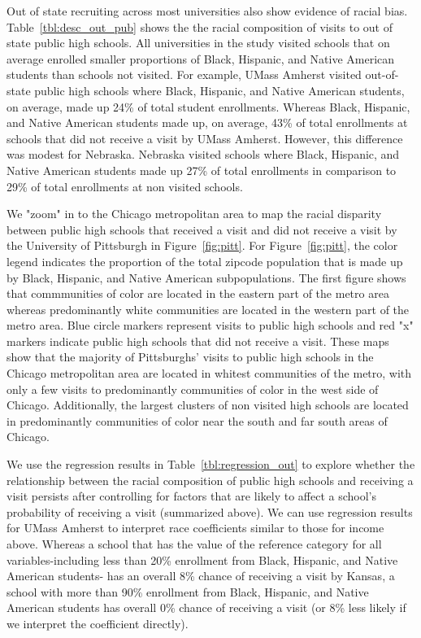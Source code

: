 \documentclass[twoside]{article}
\begin{document}
Out of state recruiting across most universities also show evidence of racial bias. Table~\ref{tbl:desc_out_pub} shows the the racial composition of visits to out of state public high schools. All universities in the study visited schools that on average enrolled smaller proportions of Black, Hispanic, and Native American students than schools not visited. For example, UMass Amherst visited out-of-state public high schools where Black, Hispanic, and Native American students, on average, made up 24\% of total student enrollments. Whereas Black, Hispanic, and Native American students made up, on average, 43\% of total enrollments at schools that did not receive a visit by UMass Amherst. However, this difference was modest for Nebraska. Nebraska visited schools where Black, Hispanic, and Native American students made up 27\% of total enrollments in comparison to 29\% of total enrollments at non visited schools.

We "zoom" in to the Chicago metropolitan area to map the racial disparity between public high schools that received a visit and did not receive a visit by the University of Pittsburgh in Figure~\ref{fig:pitt}. For Figure~\ref{fig:pitt}, the color legend indicates the proportion of the total zipcode population that is made up by Black, Hispanic, and Native American subpopulations. The first figure shows that commmunities of color are located in the eastern part of the metro area whereas predominantly white communities are located in the western part of the metro area. Blue circle markers represent visits to public high schools and red "x" markers indicate public high schools that did not receive a visit. These maps show that the majority of Pittsburghs' visits to public high schools in the Chicago metropolitan area are located in whitest communities of the metro, with only a few visits to predominantly communities of color in the west side of Chicago. Additionally, the largest clusters of non visited high schools are located in predominantly communities of color near the south and far south areas of Chicago.


We use the regression results in Table~\ref{tbl:regression_out} to explore whether the relationship between the racial composition of public high schools and receiving a visit persists after controlling for factors that are likely to affect a school's probability of receiving a visit (summarized above). We can use regression results for UMass Amherst to interpret race coefficients similar to those for income above. Whereas a school that has the value of the reference category for all variables-including less than 20\% enrollment from Black, Hispanic, and Native American students- has an overall 8\% chance of receiving a visit by Kansas, a school with more than 90\% enrollment from Black, Hispanic, and Native American students has overall 0\% chance of receiving a visit (or 8\% less likely if we interpret the coefficient directly).
\end{document}
